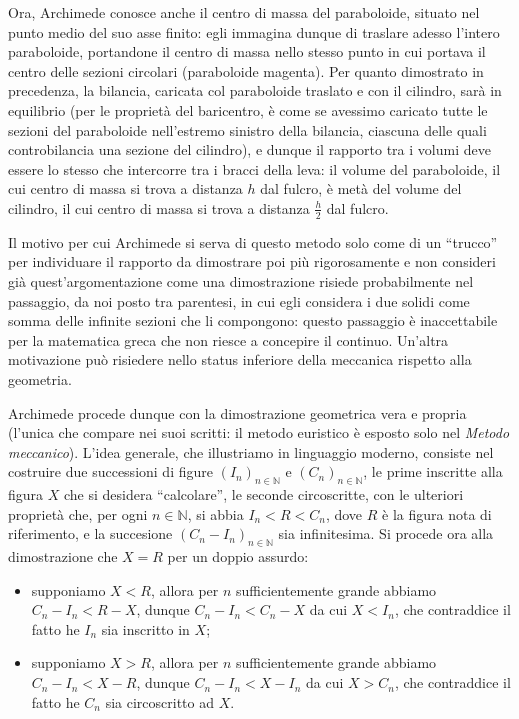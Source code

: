 \par Ora, Archimede conosce anche il centro di massa del paraboloide, situato nel punto medio del suo asse finito: egli immagina dunque di traslare adesso l'intero paraboloide, portandone il centro di massa nello stesso punto in cui portava il centro delle sezioni circolari (paraboloide magenta). Per quanto dimostrato in precedenza, la bilancia, caricata col paraboloide traslato e con il cilindro, sar\`a in equilibrio (per le propriet\`a del baricentro, \`e come se avessimo caricato tutte le sezioni del paraboloide nell'estremo sinistro della bilancia, ciascuna delle quali controbilancia una sezione del cilindro), e dunque il rapporto tra i volumi deve essere lo stesso che intercorre tra i bracci della leva: il volume del paraboloide, il cui centro di massa si trova a distanza $h$ dal fulcro, \`e met\`a del volume del cilindro, il cui centro di massa si trova a distanza $\frac{h}{2}$ dal fulcro.
\par Il motivo per cui Archimede si serva di questo metodo solo come di un ``trucco'' per individuare il rapporto da dimostrare poi pi\`u rigorosamente e non consideri gi\`a quest'argomentazione come una dimostrazione risiede probabilmente nel passaggio, da noi posto tra parentesi, in cui egli considera i due solidi come somma delle infinite sezioni che li compongono: questo passaggio \`e inaccettabile per la matematica greca che non riesce a concepire il continuo. Un'altra motivazione pu\`o risiedere nello status inferiore della meccanica rispetto alla geometria.
\par Archimede procede dunque con la dimostrazione geometrica vera e propria (l'unica che compare nei suoi scritti: il metodo euristico \`e esposto solo nel \textit{Metodo meccanico}). L'idea generale, che illustriamo in linguaggio moderno, consiste nel costruire due successioni di figure $(I_n)_{n \in \mathbb{N}}$ e $(C_n)_{n \in \mathbb{N}}$, le prime inscritte alla figura $X$ che si desidera ``calcolare'', le seconde circoscritte, con le ulteriori propriet\`a che, per ogni $n \in \mathbb{N}$, si abbia $I_n < R < C_n$, dove $R$ \`e la figura nota di riferimento, e la succesione $(C_n - I_n)_{n \in \mathbb{N}}$ sia infinitesima. Si procede ora alla dimostrazione che $X = R$ per un doppio assurdo:
\begin{itemize}
	\item supponiamo $X < R$, allora per $n$ sufficientemente grande abbiamo $C_n - I_n < R - X$, dunque $C_n - I_n < C_n - X$ da cui $X < I_n$, che contraddice il fatto he $I_n$ sia inscritto in $X$;
	\item supponiamo $X > R$, allora per $n$ sufficientemente grande abbiamo $C_n - I_n < X - R$, dunque $C_n - I_n < X - I_n$ da cui $X > C_n$, che contraddice il fatto he $C_n$ sia circoscritto ad $X$.
\end{itemize}
